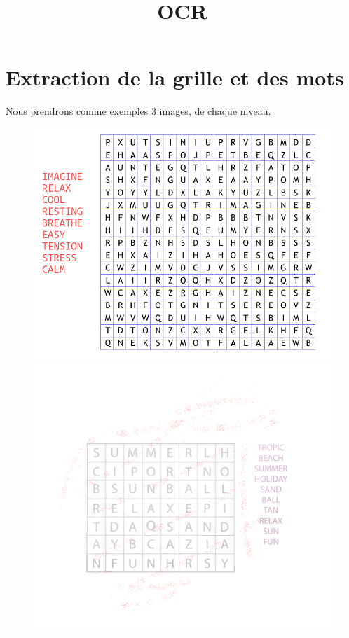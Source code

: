 \documentclass{article}
\title{OCR}
\author{}
\date{}
\begin{document}
\maketitle
\tableofcontents

\newpage



\section{Extraction de la grille et des mots}

Nous prendrons comme exemples 3 images, de chaque niveau.

\begin{figure}[!htb]
      \includegraphics[width=\linewidth]{images/level_1_image_1.png}
      \caption{}
    \endminipage\hfill
      \includegraphics[width=\linewidth]{images/level_2_image_1_rotated_25.0deg.png}

\end{figure}
\end{document}
